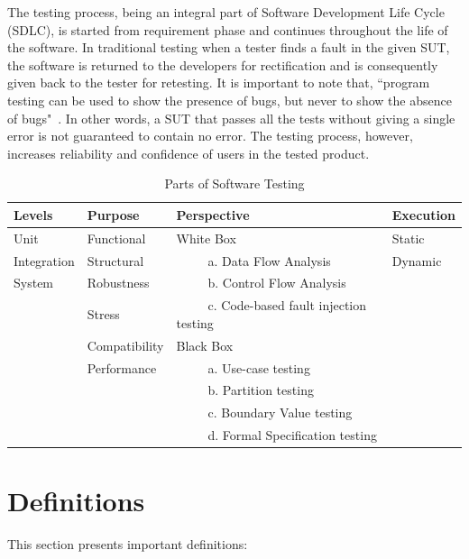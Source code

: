 The testing process, being an integral part of Software Development Life Cycle (SDLC), is started from requirement phase and continues throughout the life of the software. In traditional testing when a tester finds a fault in the given SUT, the software is returned to the developers for rectification and is consequently given back to the tester for retesting. It is important to note that, ``program testing can be used to show the presence of bugs, but never to show the absence of bugs"~\cite{Dijkstra1972}. In other words, a SUT that passes all the tests without giving a single error is not guaranteed to contain no error. The testing process, however, increases reliability and confidence of users in the tested product. \\


\begin{table}[ht]
\caption{Parts of Software Testing} %
\smallskip
\centering %
{\renewcommand{\arraystretch}{1.5} %
\begin{tabular}{| l | l | l | l | } %
\hline

Levels 					&Purpose		 		& Perspective							& Execution 	\\
\hline
Unit						& Functional			& White Box							& Static 		\\
Integration				& Structural			& ~~~~~a. Data Flow Analysis				& Dynamic	\\
System					& Robustness			& ~~~~~b. Control Flow Analysis			&			\\
						& Stress				& ~~~~~c. Code-based fault injection testing 	&			\\
						& Compatibility			& Black Box							&			\\
						& Performance			& ~~~~~a. Use-case testing				&			\\
						&					& ~~~~~b. Partition testing				&			\\
						&					& ~~~~~c. Boundary Value testing			&			\\
						&					& ~~~~~d. Formal Specification testing		&			\\



\hline %
\end{tabular}
}
\bigskip
\label{table:softwareTestingParts} %
\end{table}

\section{Definitions}
This section presents important definitions:

